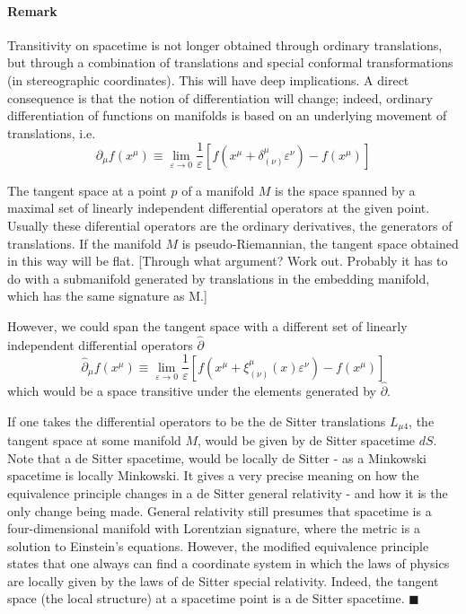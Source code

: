 \documentclass[10pt]{article}
\newcommand{\pd}{\partial}
\newcommand{\blu}{\color{blue}}
\begin{document}
\paragraph{{\blu Remark}}
Transitivity on spacetime is not longer obtained through ordinary 
translations, but through a combination of translations and 
special conformal transformations (in stereographic coordinates).  
This will have deep implications. A direct consequence is that 
the notion of differentiation will change; indeed, ordinary 
differentiation of functions on manifolds is based on an 
underlying movement of translations, i.e.
\begin{equation}
	\partial_\mu f(x^\mu) \equiv \lim_{\varepsilon \rightarrow 0}
	\frac{1}{\varepsilon}\left[f(x^\mu + 
		\delta^\mu_{(\nu)}\varepsilon^\nu) - f(x^\mu) \right]
\end{equation}

The tangent space at a point $p$ of a manifold $M$ is the space 
spanned by a maximal set of linearly independent differential 
operators at the given point.  Usually these diferential 
operators are the ordinary derivatives, the generators of 
translations. If the manifold $M$ is pseudo-Riemannian, the 
tangent space obtained in this way will be flat. [Through what 
argument? Work out.  Probably it has to do with a submanifold 
generated by translations in the embedding manifold, which has 
the same signature as M.]

However, we could span the tangent space with a different set of 
linearly independent differential operators $\hat{\pd}$
\begin{equation}
	\hat{\pd}_\mu f(x^\mu)\equiv \lim_{\varepsilon \rightarrow 0} 
	\frac{1}{\varepsilon}\left[f(x^\mu + 
		\xi^\mu_{(\nu)}(x)\varepsilon^\nu) - f(x^\mu) \right]
\end{equation}
which would be a space transitive under the elements generated by 
$\hat{\pd}$.

If one takes the differential operators to be the de Sitter 
translations $L_{\mu4}$, the tangent space at some manifold $M$, 
would be given by de Sitter spacetime $dS$. Note that a de Sitter 
spacetime, would be locally de Sitter - as a Minkowski spacetime 
is locally Minkowski. It gives a very precise meaning on how the 
equivalence principle changes in a de Sitter general relativity - 
and how it is the only change being made. General relativity 
still presumes that spacetime is a four-dimensional manifold with 
Lorentzian signature, where the metric is a solution to 
Einstein's equations. However, the modified equivalence principle 
states that one always can find a coordinate system in which the 
laws of physics are locally given by the laws of de Sitter 
special relativity.  Indeed, the tangent space (the local 
structure) at a spacetime point is a de Sitter spacetime. \hfill 
{\blu $\blacksquare$}
\end{document}
